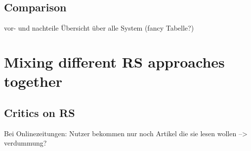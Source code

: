 \subsection{Comparison}
vor- und nachteile
\"Ubersicht \"uber alle System (fancy Tabelle?)

\section{Mixing different RS approaches together}

\subsection{Critics on RS}
Bei Onlinezeitungen: Nutzer bekommen nur noch Artikel die sie lesen wollen --> verdummung?

